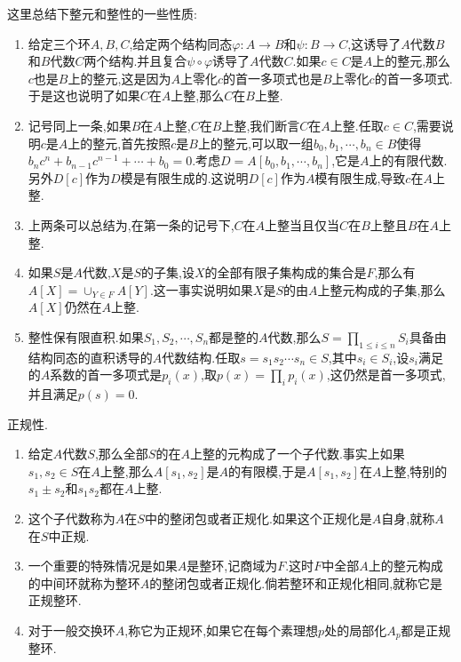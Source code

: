 这里总结下整元和整性的一些性质:
\begin{enumerate}
	\item 给定三个环$A,B,C$,给定两个结构同态$\varphi:A\to B$和$\psi:B\to C$,这诱导了$A$代数$B$和$B$代数$C$两个结构.并且复合$\psi\circ\varphi$诱导了$A$代数$C$.如果$c\in C$是$A$上的整元,那么$c$也是$B$上的整元,这是因为$A$上零化$c$的首一多项式也是$B$上零化$c$的首一多项式.于是这也说明了如果$C$在$A$上整,那么$C$在$B$上整.
	\item 记号同上一条,如果$B$在$A$上整,$C$在$B$上整,我们断言$C$在$A$上整.任取$c\in C$,需要说明$c$是$A$上的整元,首先按照$c$是$B$上的整元,可以取一组$b_0,b_1,\cdots,b_n\in B$使得$b_nc^n+b_{n-1}c^{n-1}+\cdots+b_0=0$.考虑$D=A[b_0,b_1,\cdots,b_n]$,它是$A$上的有限代数.另外$D[c]$作为$D$模是有限生成的.这说明$D[c]$作为$A$模有限生成,导致$c$在$A$上整.
	\item 上两条可以总结为,在第一条的记号下,$C$在$A$上整当且仅当$C$在$B$上整且$B$在$A$上整.
	\item 如果$S$是$A$代数,$X$是$S$的子集,设$X$的全部有限子集构成的集合是$F$,那么有$A[X]=\cup_{Y\in F}A[Y]$.这一事实说明如果$X$是$S$的由$A$上整元构成的子集,那么$A[X]$仍然在$A$上整.
	\item 整性保有限直积.如果$S_1,S_2,\cdots,S_n$都是整的$A$代数,那么$S=\prod_{1\le i\le n}S_i$具备由结构同态的直积诱导的$A$代数结构.任取$s=s_1s_2\cdots s_n\in S$,其中$s_i\in S_i$,设$s_i$满足的$A$系数的首一多项式是$p_i(x)$,取$p(x)=\prod_ip_i(x)$,这仍然是首一多项式,并且满足$p(s)=0$.
\end{enumerate}

正规性.
\begin{enumerate}
	\item 给定$A$代数$S$,那么全部$S$的在$A$上整的元构成了一个子代数.事实上如果$s_1,s_2\in S$在$A$上整,那么$A[s_1,s_2]$是$A$的有限模,于是$A[s_1,s_2]$在$A$上整,特别的$s_1\pm s_2$和$s_1s_2$都在$A$上整.
	\item 这个子代数称为$A$在$S$中的整闭包或者正规化.如果这个正规化是$A$自身,就称$A$在$S$中正规.
	\item 一个重要的特殊情况是如果$A$是整环,记商域为$F$.这时$F$中全部$A$上的整元构成的中间环就称为整环$A$的整闭包或者正规化.倘若整环和正规化相同,就称它是正规整环.
	\item 对于一般交换环$A$,称它为正规环,如果它在每个素理想$p$处的局部化$A_p$都是正规整环.
\end{enumerate}


